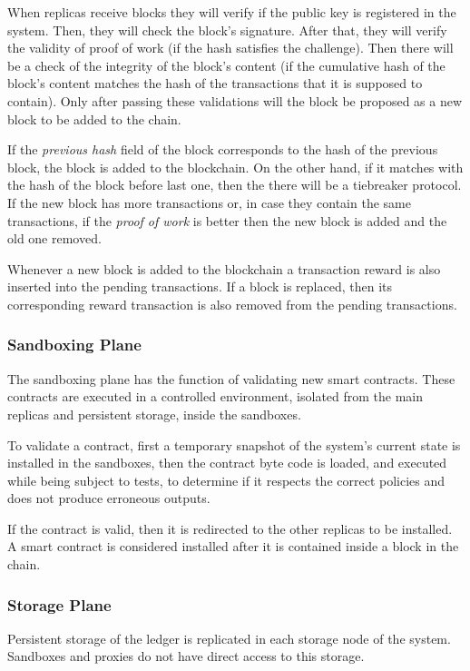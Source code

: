 \documentclass[10pt,journal,compsoc]{IEEEtran}
\begin{document}
    When replicas receive blocks they will verify if the public key is registered in the system. Then, they will check the block's signature. After that, they will verify the validity of proof of work (if the hash satisfies the challenge). Then there will be a check of the integrity of the block's content (if the cumulative hash of the block's content matches the hash of the transactions that it is supposed to contain). Only after passing these validations will the block be proposed as a new block to be added to the chain.
    
    If the \textit{previous hash} field of the block corresponds to the hash of the previous block, the block is added to the blockchain. On the other hand, if it matches with the hash of the block before last one, then the there will be a tiebreaker protocol. If the new block has more transactions or, in case they contain the same transactions, if the \textit{proof of work} is better then the new block is added and the old one removed.
    
    Whenever a new block is added to the blockchain a transaction reward is also inserted into the pending transactions. If a block is replaced, then its corresponding reward transaction is also removed from the pending transactions. 
	
	
	\subsubsection{Sandboxing Plane}
	
	The sandboxing plane has the function of validating new smart contracts. These contracts are executed in a controlled environment, isolated from the main replicas and persistent storage, inside the sandboxes.
	
	To validate a contract, first a temporary snapshot of the system's current state is installed in the sandboxes, then the contract byte code is loaded, and executed while being subject to tests, to determine if it respects the correct policies and does not produce erroneous outputs.
	
	If the contract is valid, then it is redirected to the other replicas to be installed. A smart contract is considered installed after it is contained inside a block in the chain.
	
	\subsubsection{Storage Plane}
	Persistent storage of the ledger is replicated in each storage node of the system. Sandboxes and proxies do not have direct access to this storage.
	
\end{document}
